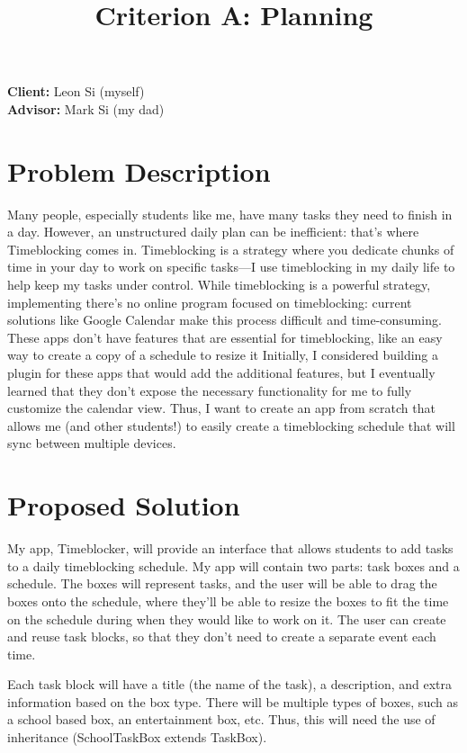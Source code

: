 \documentclass[12pt, notitlepage]{article}
\title{Criterion A: Planning}
\begin{document}
\centerline{\textcolor{msblue}{
		\textbf{\fontsize{13}{13}\MyTitle}
	}}

\noindent\textbf{Client:} Leon Si (myself)
\\
\textbf{Advisor:} Mark Si (my dad)

\section{Problem Description}
Many people, especially students like me, have many tasks they need to finish in a day.
However, an unstructured daily plan can be inefficient: that's where Timeblocking comes in.
Timeblocking is a strategy where you dedicate chunks of time in your day to work on specific tasks—I use timeblocking in my daily life to help keep my tasks under control.
While timeblocking is a powerful strategy, implementing
there's no online program focused on timeblocking: current solutions like Google Calendar make this process difficult and time-consuming.
These apps don't have features that are essential for timeblocking, like an easy way to create a copy of a schedule to resize it
Initially, I considered building a plugin for these apps that would add the additional features, but I eventually learned that they don't expose the necessary functionality for me to fully customize the calendar view.
Thus, I want to create an app from scratch that allows me (and other students!) to easily create a timeblocking schedule that will sync between multiple devices.

\bigskip
{}

\section{Proposed Solution}
My app, Timeblocker, will provide an interface that allows students to add tasks to a daily timeblocking schedule.
My app will contain two parts: task boxes and a schedule. The boxes will represent tasks, and the user will be able to drag the boxes onto the schedule, where they'll be able to resize the boxes to fit the time on the schedule during when they would like to work on it. The user can create and reuse task blocks, so that they don't need to create a separate event each time.

Each task block will have a title (the name of the task), a description, and extra information based on the box type.
There will be multiple types of boxes, such as a school based box, an entertainment box, etc.
Thus, this will need the use of inheritance (SchoolTaskBox extends TaskBox).
\end{document}
